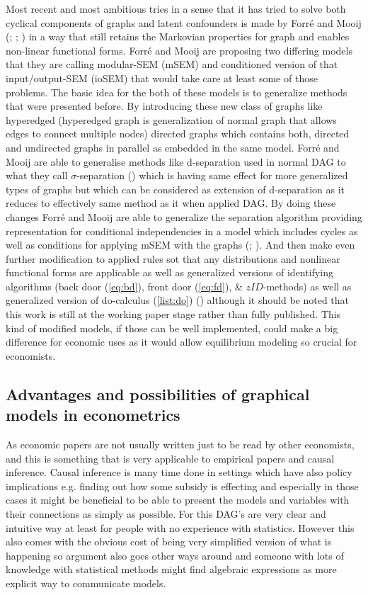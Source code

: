 \documentclass[main=english,12pt,a4paper,pdftex,econ,utf8]{aaltothesis}
\begin{document}
Most recent and most ambitious tries in a sense that it has tried to solve both cyclical components of graphs and latent confounders is made by Forré and Mooij (\cite{Forre2017}; \cite{Forre2018}; \cite{Forre2019}) in a way that still retains the Markovian properties for graph and enables non-linear functional forms. Forré and Mooij are proposing two differing models that they are calling modular-SEM (mSEM) and conditioned version of that input/output-SEM (ioSEM) that would take care at least some of those problems. The basic idea for the both of these models is to generalize methods that were presented before. By introducing these new class of graphs like hyperedged (hyperedged graph is generalization of normal graph that allows edges to connect multiple nodes) directed graphs which contains both, directed and undirected graphs in parallel as embedded in the same model. Forré and Mooij are able to generalise methods like d-separation used in normal DAG to what they call $\sigma$-separation (\cite{Forre2017}) which is having same effect for more generalized types of graphs but which can be considered as extension of d-separation as it reduces to effectively same method as it when applied DAG. By doing these changes Forré and Mooij are able to generalize the separation algorithm providing representation for conditional independencies in a model which includes cycles as well as conditions for applying mSEM with the graphs (\cite{Forre2017}; \cite{Forre2018}). And then make even further modification to applied rules sot that any distributions and nonlinear functional forms are applicable as well as generalized versions of identifying algorithms (back door (\ref{eq:bd}), front door (\ref{eq:fd}), \& $zID$-methods) as well as generalized version of do-calculus (\ref{list:do})  (\cite{Forre2019}) although it should be noted that this work is still at the working paper stage rather than fully published. This kind of modified models, if those can be well implemented, could make a big difference for economic uses as it would allow equilibrium modeling so crucial for economists.

\subsection{Advantages and possibilities of graphical models in econometrics}

As economic papers are not usually written just to be read by other economists, and this is something that is very applicable to empirical papers and causal inference. Causal inference is many time done in settings which have also policy implications e.g. finding out how some subsidy is effecting and especially in those cases it might be beneficial to be able to present the models and variables with their connections as simply as possible. For this DAG's are very clear and intuitive way at least for people with no experience with statistics. However this also comes with the obvious cost of being very simplified version of what is happening so argument also goes other ways around and someone with lots of knowledge with statistical methods might find algebraic expressions as more explicit way to communicate models. 
\end{document}
